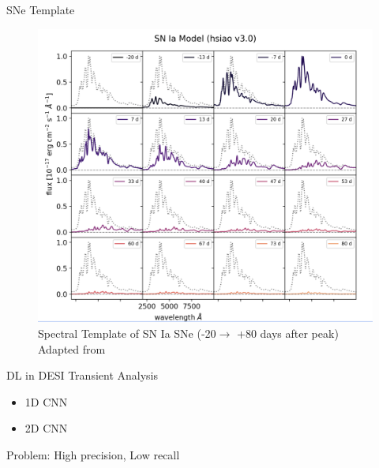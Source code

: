 \begin{frame}{SNe Template}
    \begin{figure}[t]
        \includegraphics[width=.6\textwidth]{figures/desi_figures/snia_templates.png}
        \caption{Spectral Template of SN Ia SNe (-20$\to$ +80 days after peak) Adapted from \textcite{DESIpresentation}}
        \label{fig:sne_template}
    \end{figure}
\end{frame}

\begin{frame}{DL in DESI Transient Analysis}
\begin{itemize}
    \item 1D CNN \parencite{wasserman2021}
    \item 2D CNN \parencite{Sepeku2022}
\end{itemize}
Problem: High precision, Low recall
\end{frame}


